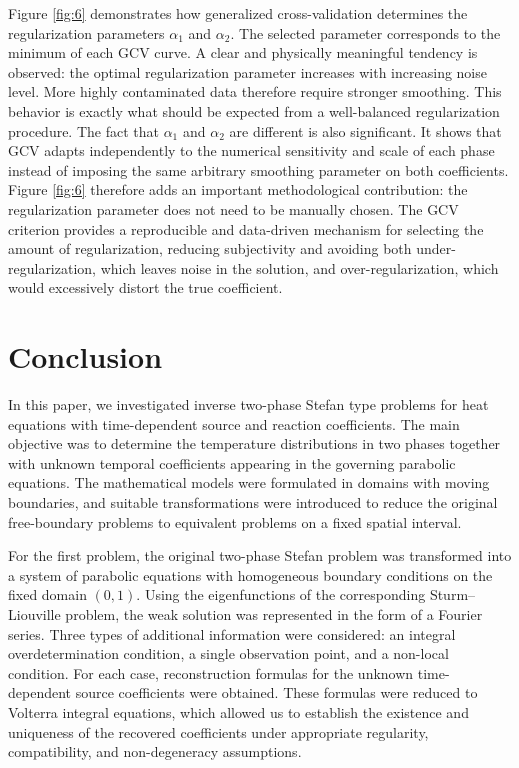 \documentclass[preprint,12pt,authoryear]{elsarticle}
\begin{document}
Figure \ref{fig:6} demonstrates how generalized cross-validation determines the regularization parameters $\alpha_1$ and $\alpha_2$. The selected parameter corresponds to the minimum of each GCV curve. A clear and physically meaningful tendency is observed: the optimal regularization parameter increases with increasing noise level. More highly contaminated data therefore require stronger smoothing. This behavior is exactly what should be expected from a well-balanced regularization procedure. The fact that $\alpha_1$ and $\alpha_2$ are different is also significant. It shows that GCV adapts independently to the numerical sensitivity and scale of each phase instead of imposing the same arbitrary smoothing parameter on both coefficients. Figure \ref{fig:6} therefore adds an important methodological contribution: the regularization parameter does not need to be manually chosen. The GCV criterion provides a reproducible and data-driven mechanism for selecting the amount of regularization, reducing subjectivity and avoiding both under-regularization, which leaves noise in the solution, and over-regularization, which would excessively distort the true coefficient.




\section{Conclusion}
In this paper, we investigated inverse two-phase Stefan type problems for heat equations with time-dependent source and reaction coefficients. The main objective was to determine the temperature distributions in two phases together with unknown temporal coefficients appearing in the governing parabolic equations. The mathematical models were formulated in domains with moving boundaries, and suitable transformations were introduced to reduce the original free-boundary problems to equivalent problems on a fixed spatial interval.

For the first problem, the original two-phase Stefan problem was transformed into a system of parabolic equations with homogeneous boundary conditions on the fixed domain $(0,1)$. Using the eigenfunctions of the corresponding Sturm--Liouville problem, the weak solution was represented in the form of a Fourier series. Three types of additional information were considered: an integral overdetermination condition, a single observation point, and a non-local condition. For each case, reconstruction formulas for the unknown time-dependent source coefficients were obtained. These formulas were reduced to Volterra integral equations, which allowed us to establish the existence and uniqueness of the recovered coefficients under appropriate regularity, compatibility, and non-degeneracy assumptions.
\end{document}
